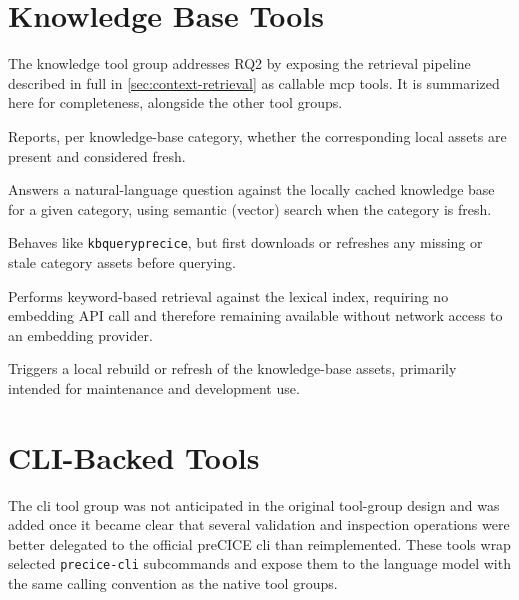 \documentclass[
  numbers=noenddot,
  english,
  a4paper,
  twoside,
  bibliography=totoc,
  headsepline,
  cleardoublepage=empty,
  parskip=half,
  draft=false
]{scrbook}
\theoremstyle{break}
\renewcommand{\_}{\textunderscore\allowbreak}
\begin{document}
\FloatBarrier

\section{Knowledge Base Tools}\label{sec:mcp-server:knowledge-tools}

The knowledge tool group addresses RQ2 by exposing the retrieval pipeline described in full in
\cref{sec:context-retrieval} as callable \gls{mcp} tools.
It is summarized here for completeness, alongside the other tool groups.

\begin{description}[font=\ttfamily]
  \item[kb\_precice\_status] Reports, per knowledge-base category, whether the corresponding
        local assets are present and considered fresh.
  \item[kb\_query\_precice] Answers a natural-language question against the locally cached
        knowledge base for a given category, using semantic (vector) search when the category
        is fresh.
  \item[kb\_query\_precice\_live] Behaves like \texttt{kb\_query\_precice}, but first downloads
        or refreshes any missing or stale category assets before querying.
  \item[kb\_query\_precice\_lexical] Performs keyword-based retrieval against the lexical index,
        requiring no embedding API call and therefore remaining available without network
        access to an embedding provider.
  \item[kb\_ingest\_precice\_data] Triggers a local rebuild or refresh of the knowledge-base
        assets, primarily intended for maintenance and development use.
\end{description}


\section{CLI-Backed Tools}\label{sec:mcp-server:cli-tools}

The \gls{cli} tool group was not anticipated in the original tool-group design and was added
once it became clear that several validation and inspection operations were better delegated to
the official preCICE \gls{cli} than reimplemented.
These tools wrap selected \texttt{precice-cli} subcommands and expose them to the language
model with the same calling convention as the native tool groups.
\end{document}
